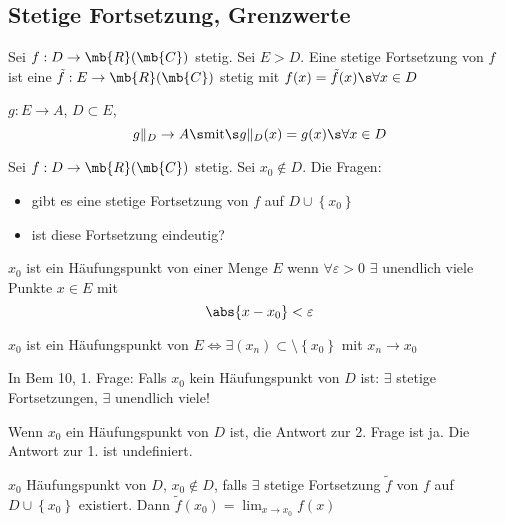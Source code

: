 \subsection{Stetige Fortsetzung, Grenzwerte}
\begin{Def}
  Sei $f:D\to\mb{R}(\mb{C})$ stetig. Sei $E>D$. Eine stetige Fortsetzung von $f$ ist eine $\tilde f:E\to\mb{R}(\mb{C})$ stetig mit $f(x)=\tilde f(x)\s\forall x\in D$
\end{Def}
\begin{Def}
  $g:E\to A$, $D\subset E$, 
  \[g\|_D\to A\s\text{mit}\s g\|_D(x)=g(x)\s\forall x\in D\]
\end{Def}
\begin{Bem}
  Sei $f:D\to\mb{R}(\mb{C})$ stetig. Sei $x_0\not\in D$. Die Fragen:
  \begin{itemize}
    \item gibt es eine stetige Fortsetzung von $f$ auf $D\cup \left\{ x_0 \right\}$
    \item ist diese Fortsetzung eindeutig?
  \end{itemize}
\end{Bem}
\begin{Def}
  $x_0$ ist ein Häufungspunkt von einer Menge $E$ wenn $\forall \varepsilon>0$ $\exists$ unendlich viele Punkte $x\in E$ mit
  \[\abs{x-x_0}<\varepsilon\]
\end{Def}
\begin{Bem}
  $x_0$ ist ein Häufungspunkt von $E\iff \exists(x_n)\subset\setminus\left\{ x_0 \right\}$ mit $x_n\to x_0$
\end{Bem}
\begin{Bem}
  In Bem 10, 1. Frage: Falls $x_0$ kein Häufungspunkt von $D$ ist: $\exists$ stetige Fortsetzungen, $\exists$ unendlich viele!
\end{Bem}
\begin{Bem}
  Wenn $x_0$ ein Häufungspunkt von $D$ ist, die Antwort zur 2. Frage ist ja. Die Antwort zur 1. ist undefiniert.
\end{Bem}
\begin{Def}
  $x_0$ Häufungspunkt von $D$, $x_0\not\in D$, falls $\exists$ stetige Fortsetzung $\tilde f$ von $f$ auf $D\cup\left\{ x_0 \right\}$ existiert. Dann $\tilde f(x_0)=\lim_{x\to x_0}f(x)$
\end{Def}
